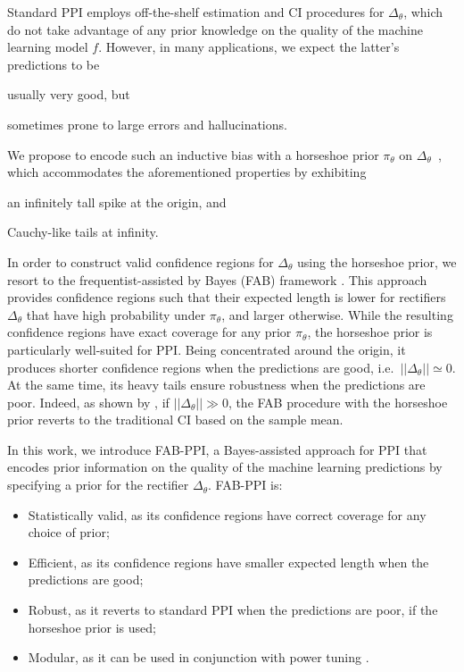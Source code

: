 Standard PPI employs off-the-shelf estimation and CI procedures for $\Delta_\theta$, which do not take advantage of any prior knowledge on the quality of the machine learning model $f$. 
However, in many applications, we expect the latter's predictions to be
\begin{enuminline}
    \item usually very good, but
    \item sometimes prone to large errors and hallucinations.
\end{enuminline}
We propose to encode such an inductive bias with a horseshoe prior $\pi_\theta$ on $\Delta_\theta$~\citep{Carvalho2010}, which accommodates the aforementioned properties by exhibiting
\begin{enuminline}
    \item an infinitely tall spike at the origin, and
    \item Cauchy-like tails at infinity.
\end{enuminline}
In order to construct valid confidence regions for $\Delta_\theta$ using the horseshoe prior, we resort to the frequentist-assisted by Bayes (FAB) framework \citep{Pratt1961,Pratt1963,Yu2018}. 
This approach provides confidence regions such that their expected length is lower for rectifiers $\Delta_\theta$ that have high probability under $\pi_\theta$, and larger otherwise.
While the resulting confidence regions have exact coverage for any prior $\pi_\theta$, the horseshoe prior is particularly well-suited for PPI. Being concentrated around the origin, it produces shorter confidence regions when the predictions are good, i.e.~$||\Delta_\theta|| \simeq 0$.
At the same time, its heavy tails ensure robustness when the predictions are poor. Indeed, as shown by \citet{Cortinovis2024}, if $||\Delta_\theta||\gg0$, the FAB procedure with the horseshoe prior reverts to the traditional CI based on the sample mean.

In this work, we introduce FAB-PPI, a Bayes-assisted approach for PPI that encodes prior information on the quality of the machine learning predictions by specifying a prior for the rectifier $\Delta_\theta$. FAB-PPI is:
\begin{itemize}\setlength\itemsep{0em}
    \item Statistically valid, as its confidence regions have correct coverage for any choice of prior;
    \item Efficient, as its confidence regions have smaller expected length when the predictions are good;
    \item Robust, as it reverts to standard PPI when the predictions are poor, if the horseshoe prior is used;
    \item Modular, as it can be used in conjunction with power tuning \citep{Angelopoulos2023a}.
\end{itemize}

